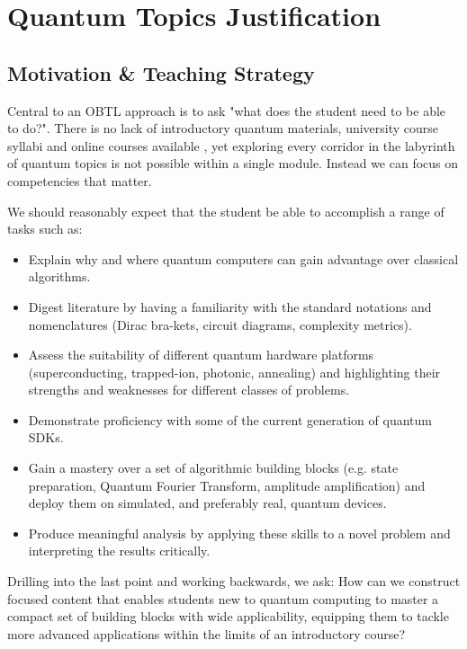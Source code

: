 \section{Quantum Topics Justification}

\subsection{Motivation \& Teaching Strategy}

Central to an OBTL approach is to ask "what does the student need to be able to do?". 
There is no lack of introductory quantum materials, university course syllabi and online courses available \cite{Ekert:2000}\cite{Abhijith:2022}\cite{Lipton:2021},  
yet exploring every corridor in the labyrinth of quantum topics is not possible within a single module.
Instead we can focus on competencies that matter.

We should reasonably expect that the student be able to accomplish a range of tasks such as:
\begin{itemize}
	\item Explain why and where quantum computers can gain advantage over classical algorithms.
	\item Digest literature by having a familiarity with the standard notations and nomenclatures (Dirac bra-kets, circuit diagrams, complexity metrics).
	\item Assess the suitability of different quantum hardware platforms (superconducting, trapped-ion, photonic, annealing) and highlighting their strengths and weaknesses for different classes of problems.
	\item Demonstrate proficiency with some of the current generation of quantum SDKs.
	\item Gain a mastery over a set of algorithmic building blocks (e.g. state preparation, Quantum Fourier Transform, amplitude amplification) and deploy them on simulated, and preferably real,
	 quantum devices.
	\item Produce meaningful analysis by applying these skills to a novel problem and interpreting the results critically.
\end{itemize}

Drilling into the last point and working backwards, we ask: 
How can we construct focused content that enables students new to quantum computing to master a compact set of 
building blocks with wide applicability, equipping them to tackle more advanced applications
within the limits of an introductory course?

